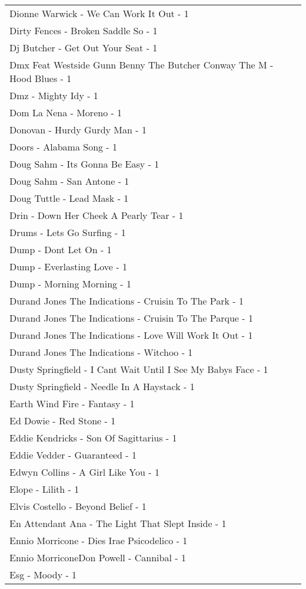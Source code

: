 \documentclass[
]{article}
\begin{document}
\begin{longtable}{l}
Dionne Warwick - We Can Work It Out - 1 \\ 
Dirty Fences - Broken Saddle So - 1 \\ 
Dj Butcher - Get Out Your Seat - 1 \\ 
Dmx Feat Westside Gunn Benny The Butcher Conway The M - Hood Blues - 1 \\ 
Dmz - Mighty Idy - 1 \\ 
Dom La Nena - Moreno - 1 \\ 
Donovan - Hurdy Gurdy Man - 1 \\ 
Doors - Alabama Song - 1 \\ 
Doug Sahm - Its Gonna Be Easy - 1 \\ 
Doug Sahm - San Antone - 1 \\ 
Doug Tuttle - Lead Mask - 1 \\ 
Drin - Down Her Cheek A Pearly Tear - 1 \\ 
Drums - Lets Go Surfing - 1 \\ 
Dump - Dont Let On - 1 \\ 
Dump - Everlasting Love - 1 \\ 
Dump - Morning Morning - 1 \\ 
Durand Jones The Indications - Cruisin To The Park - 1 \\ 
Durand Jones The Indications - Cruisin To The Parque - 1 \\ 
Durand Jones The Indications - Love Will Work It Out - 1 \\ 
Durand Jones The Indications - Witchoo - 1 \\ 
Dusty Springfield - I Cant Wait Until I See My Babys Face - 1 \\ 
Dusty Springfield - Needle In A Haystack - 1 \\ 
Earth Wind Fire - Fantasy - 1 \\ 
Ed Dowie - Red Stone - 1 \\ 
Eddie Kendricks - Son Of Sagittarius - 1 \\ 
Eddie Vedder - Guaranteed - 1 \\ 
Edwyn Collins - A Girl Like You - 1 \\ 
Elope - Lilith - 1 \\ 
Elvis Costello - Beyond Belief - 1 \\ 
En Attendant Ana - The Light That Slept Inside - 1 \\ 
Ennio Morricone - Dies Irae Psicodelico - 1 \\ 
Ennio MorriconeDon Powell - Cannibal - 1 \\ 
Esg - Moody - 1 \\ 

\end{longtable}
\end{document}
